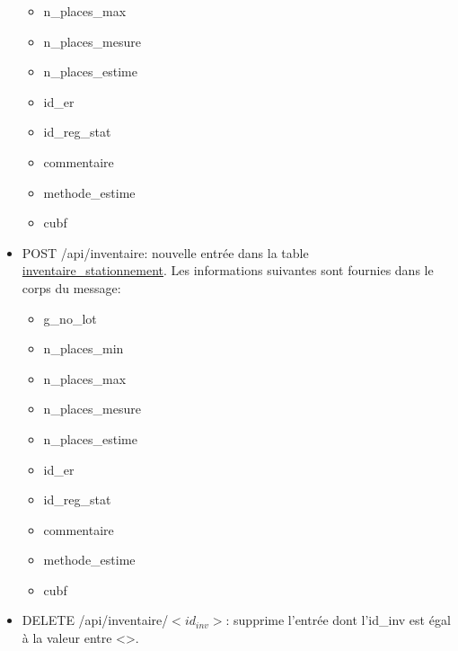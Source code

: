 \begin{itemize}
\begin{itemize}
        \item n\_places\_max
        \item n\_places\_mesure
        \item n\_places\_estime
        \item id\_er
        \item id\_reg\_stat
        \item commentaire
        \item methode\_estime
        \item cubf
    \end{itemize}
    \item POST /api/inventaire: nouvelle entrée dans la table \underline{inventaire\_stationnement}. Les informations suivantes sont fournies dans le corps du message:
    \begin{itemize}
        \item g\_no\_lot
        \item n\_places\_min
        \item n\_places\_max
        \item n\_places\_mesure
        \item n\_places\_estime
        \item id\_er
        \item id\_reg\_stat
        \item commentaire
        \item methode\_estime
        \item cubf
    \end{itemize}
    \item DELETE /api/inventaire/$<id_{inv}>$: supprime l'entrée dont l'id\_inv est égal à la valeur entre <>.
\end{itemize}\clearpage

